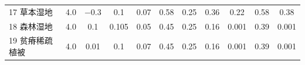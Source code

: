 \begin{landscape}
\begin{table}[htbp]
\begin{tabular}{@{}lcccccccccc@{}}
        17 草本湿地    & 4.0        & \num { -0.3  }                                                                       & 0.1                                                                                                             & 0.07                                                                                                            & 0.58                                                                                                            & 0.25                                                                                                            & 0.36                                                                                                            & 0.22                                                                                                            & 0.58                                                                                                            & 0.38                                                                                                            \\
        18 森林湿地    & 4.0        & \num { 0.1   }                                                                       & 0.105                                                                                                           & 0.05                                                                                                            & 0.45                                                                                                            & 0.25                                                                                                            & 0.16                                                                                                            & 0.001                                                                                                           & 0.39                                                                                                            & 0.001                                                                                                           \\
        19 贫瘠稀疏植被  & 4.0        & \num { 0.01  }                                                                       & 0.1                                                                                                             & 0.07                                                                                                            & 0.45                                                                                                            & 0.25                                                                                                            & 0.16                                                                                                            & 0.001                                                                                                           & 0.39                                                                                                            & 0.001                                                                                                           \\

\end{tabular}
\end{table}
\end{landscape}
